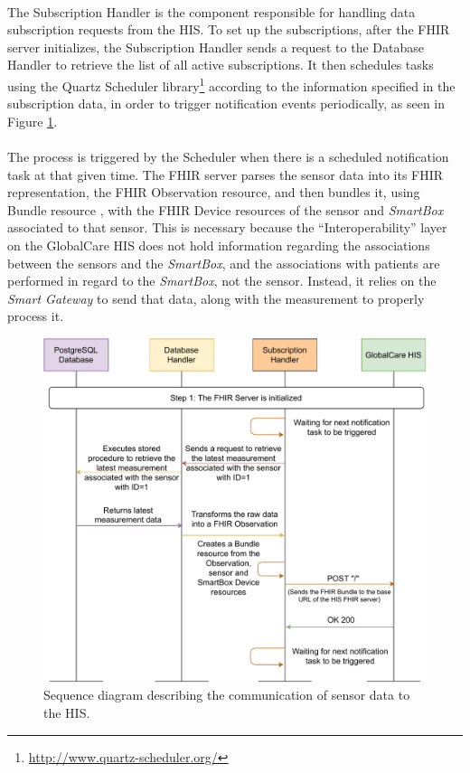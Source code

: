 \paragraph{} The Subscription Handler is the component responsible for handling data subscription requests from the \acs{HIS}. To set up the subscriptions, after the \acs{FHIR} server initializes, the Subscription Handler sends a request to the Database Handler to retrieve the list of all active subscriptions. It then schedules tasks using the Quartz Scheduler library\footnote{\url{http://www.quartz-scheduler.org/}} according to the information specified in the subscription data, in order to trigger notification events periodically, as seen in Figure \ref{fig:fhir-post-bundle}. 

\paragraph{} The process is triggered by the Scheduler when there is a scheduled notification task at that given time. The \acs{FHIR} server parses the sensor data into its \acs{FHIR} representation, the \acs{FHIR} Observation resource, and then bundles it, using Bundle resource \cite{fhir}, with the \acs{FHIR} Device resources of the sensor and \textit{SmartBox} associated to that sensor. This is necessary because the ``Interoperability'' layer on the GlobalCare \acs{HIS} does not hold information regarding the associations between the sensors and the \textit{SmartBox}, and the associations with patients are performed in regard to the \textit{SmartBox}, not the sensor. Instead, it relies on the \textit{Smart Gateway} to send that data, along with the measurement to properly process it. 

\clearpage

\begin{figure}[H]
    \centering
    \includegraphics[width=\linewidth]{images/fhir post bundle.pdf}
    \caption[Sequence diagram describing the communication of sensor data to the \acs{HIS}.]{Sequence diagram describing the communication of sensor data to the \acs{HIS}.}
    \label{fig:fhir-post-bundle}
\end{figure} 

